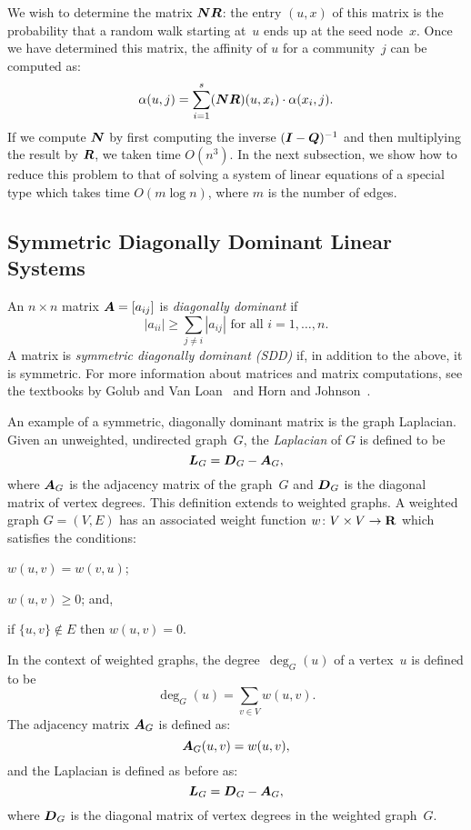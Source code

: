 We wish to determine the matrix $\boldsymbol{N} \boldsymbol{R}$: the entry $(u, x)$ of this 
matrix is the probability that a random walk starting at~$u$ ends up at the seed 
node~$x$. Once we have determined this matrix, the affinity of $u$ for 
a community~$j$ can be computed as:
\begin{equation}\label{eqn:belonging_vector}
	\alpha (u, j) = \sum_{i = 1}^{s} (\boldsymbol{N} \boldsymbol{R}) (u, x_i) \cdot \alpha (x_i, j).
\end{equation}
If we compute $\boldsymbol{N}$ by first computing the inverse $(\boldsymbol{I} - \boldsymbol{Q})^{-1}$
and then multiplying the result by $\boldsymbol{R}$, we taken time $O(n^3)$. In the 
next subsection, we show how to reduce this problem to that of solving a 
system of linear equations of a special type which takes time $O(m \log n)$, where $m$
is the number of edges. 

\subsection{Symmetric Diagonally Dominant Linear Systems}

An $n \times n$ matrix $\boldsymbol{A} = [a_{ij}]$ is \emph{diagonally dominant} if 
\[
	|a_{ii}| \geq \sum_{j \neq i} {|a_{ij}|} \mbox{ for all } i = 1, \ldots, n.
\] 
A matrix is \emph{symmetric diagonally dominant (SDD)} if, in addition to the above, 
it is symmetric. For more information about matrices and matrix computations, 
see the textbooks by Golub and Van Loan~\cite{GvL13} and Horn and Johnson~\cite{HJ13}. 

An example of a symmetric, diagonally dominant matrix is the graph Laplacian. 
Given an unweighted, undirected graph~$G$, the \emph{Laplacian} of $G$ 
is defined to be 
\[
\boldsymbol{L}_G = \boldsymbol{D}_G - \boldsymbol{A}_G,
\] 
where $\boldsymbol{A}_G$ is the adjacency matrix of the graph~$G$ and $\boldsymbol{D}_G$ 
is the diagonal matrix of vertex degrees. This definition extends 
to weighted graphs. A weighted graph $G = (V, E)$ has an associated weight function 
$w \colon V \times V \to \mathbf{R}$ which satisfies the conditions: 
\begin{inparaenum}[(1)]
	\item $w(u, v) = w(v, u)$;  
	\item $w(u, v) \geq 0$; and, 
	\item if $\{u, v\} \notin E$ then $w(u, v) = 0$. 
\end{inparaenum}
In the context of weighted graphs, the degree~$\deg_G (u)$ of a vertex~$u$ is defined to be 
\[\label{eqn:weighted_degree}
	\deg_G (u) = \sum_{v \in V} w(u, v). 
\] 
The adjacency matrix $\boldsymbol{A}_{G}$ is defined as:
\[\label{eqn:weighted_adj_matrix}
	\boldsymbol{A}_{G}(u, v) = w(u, v),
\]
and the Laplacian is defined as before as: 
\[\label{eqn:weighted_laplacian}
	\boldsymbol{L}_G = \boldsymbol{D}_G - \boldsymbol{A}_G,
\]
where $\boldsymbol{D}_G$ is the diagonal matrix of vertex degrees in the weighted graph~$G$.

